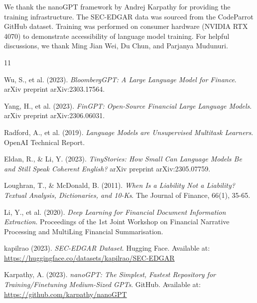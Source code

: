 \documentclass[12pt]{article}
\begin{document}
We thank the nanoGPT framework by Andrej Karpathy for providing the training infrastructure. The SEC-EDGAR data was sourced from the CodeParrot GitHub dataset. Training was performed on consumer hardware (NVIDIA RTX 4070) to demonstrate accessibility of language model training. For helpful discussions, we thank Ming Jian Wei, Du Chun, and Parjanya Mudunuri.

\begin{thebibliography}{11}

Wu, S., et al. (2023).
\textit{BloombergGPT: A Large Language Model for Finance}.
arXiv preprint arXiv:2303.17564.

Yang, H., et al. (2023).
\textit{FinGPT: Open-Source Financial Large Language Models}.
arXiv preprint arXiv:2306.06031.

Radford, A., et al. (2019).
\textit{Language Models are Unsupervised Multitask Learners}.
OpenAI Technical Report.

Eldan, R., \& Li, Y. (2023).
\textit{TinyStories: How Small Can Language Models Be and Still Speak Coherent English?}
arXiv preprint arXiv:2305.07759.

Loughran, T., \& McDonald, B. (2011).
\textit{When Is a Liability Not a Liability? Textual Analysis, Dictionaries, and 10-Ks}.
The Journal of Finance, 66(1), 35-65.

Li, Y., et al. (2020).
\textit{Deep Learning for Financial Document Information Extraction}.
Proceedings of the 1st Joint Workshop on Financial Narrative Processing and MultiLing Financial Summarisation.

kapilrao (2023).
\textit{SEC-EDGAR Dataset}.
Hugging Face. Available at: \url{https://huggingface.co/datasets/kapilrao/SEC-EDGAR}

Karpathy, A. (2023).
\textit{nanoGPT: The Simplest, Fastest Repository for Training/Finetuning Medium-Sized GPTs}.
GitHub. Available at: \url{https://github.com/karpathy/nanoGPT}

\end{thebibliography}
\end{document}
